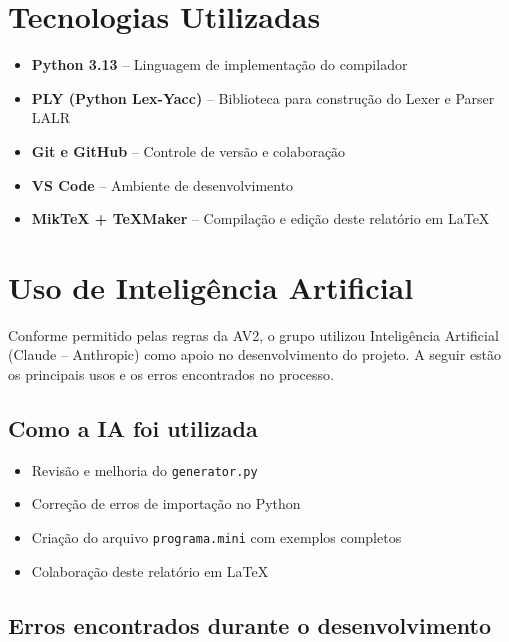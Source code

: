 \documentclass[12pt, a4paper]{article}
\begin{document}
\section{Tecnologias Utilizadas}

\begin{itemize}
    \item \textbf{Python 3.13} -- Linguagem de implementação do compilador
    \item \textbf{PLY (Python Lex-Yacc)} -- Biblioteca para construção do Lexer e Parser LALR
    \item \textbf{Git e GitHub} -- Controle de versão e colaboração
    \item \textbf{VS Code} -- Ambiente de desenvolvimento
    \item \textbf{MikTeX + TeXMaker} -- Compilação e edição deste relatório em \LaTeX{}
\end{itemize}

\section{Uso de Inteligência Artificial}

Conforme permitido pelas regras da AV2, o grupo utilizou Inteligência Artificial
(Claude -- Anthropic) como apoio no desenvolvimento do projeto. A seguir estão
os principais usos e os erros encontrados no processo.

\subsection{Como a IA foi utilizada}

\begin{itemize}
    \item Revisão e melhoria do \texttt{generator.py}
    \item Correção de erros de importação no Python
    \item Criação do arquivo \texttt{programa.mini} com exemplos completos
    \item Colaboração deste relatório em \LaTeX{}
\end{itemize}

\subsection{Erros encontrados durante o desenvolvimento}
\end{document}
